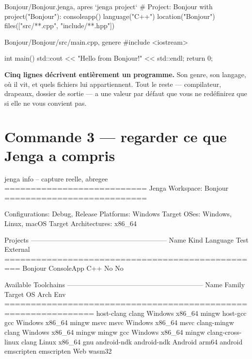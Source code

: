 \begin{nkcode}{Bonjour/Bonjour.jenga, apres `jenga project`}
    # Project: Bonjour
    with project("Bonjour"):
        consoleapp()
        language("C++")
        location("Bonjour")
        files(["src/**.cpp", "include/**.hpp"])
\end{nkcode}

\begin{nkcode}{Bonjour/Bonjour/src/main.cpp, genere}
#include <iostream>

int main() {
    std::cout << "Hello from Bonjour!" << std::endl;
    return 0;
}
\end{nkcode}

\begin{nkretenir}
\textbf{Cinq lignes décrivent entièrement un programme.} Son genre, son langage,
où il vit, et quels fichiers lui appartiennent. Tout le reste --- compilateur,
drapeaux, dossier de sortie --- a une valeur par défaut que vous ne redéfinirez
que si elle ne vous convient pas.
\end{nkretenir}

\section{Commande 3 --- regarder ce que Jenga a compris}

\begin{nkcode}{jenga info -- capture reelle, abregee}
=========================== Jenga Workspace: Bonjour ===========================

Configurations: Debug, Release
Platforms: Windows
Target OSes: Windows, Linux, macOS
Target Architectures: x86_64

Projects
------------------------------------------------------------
Name      Kind         Language   Test   External
=================================================
Bonjour   ConsoleApp   C++        No     No

Available Toolchains
------------------------------------------------------------
Name                 Family        Target OS   Arch     Env
===============================================================
host-clang           clang         Windows     x86_64   mingw
host-gcc             gcc           Windows     x86_64   mingw
msvc                 msvc          Windows     x86_64   msvc
clang-mingw          clang         Windows     x86_64   mingw
mingw                gcc           Windows     x86_64   mingw
clang-cross-linux    clang         Linux       x86_64   gnu
android-ndk          android-ndk   Android     arm64    android
emscripten           emscripten    Web         wasm32
\end{nkcode}

